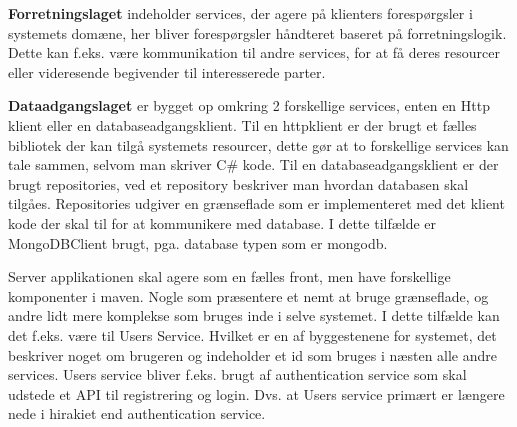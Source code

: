 \textbf{Forretningslaget} indeholder services, der agere på klienters forespørgsler i systemets domæne, her bliver forespørgsler håndteret baseret på forretningslogik. Dette kan f.eks. være kommunikation til andre services, for at få deres resourcer eller videresende begivender til interesserede parter. 

\textbf{Dataadgangslaget} er bygget op omkring 2 forskellige services, enten en Http klient eller en databaseadgangsklient. Til en httpklient er der brugt et fælles bibliotek der kan tilgå systemets resourcer, dette gør at to forskellige services kan tale sammen, selvom man skriver C\# kode. Til en databaseadgangsklient er der brugt repositories, ved et repository beskriver man hvordan databasen skal tilgåes. Repositories udgiver en grænseflade som er implementeret med det klient kode der skal til for at kommunikere med database. I dette tilfælde er MongoDBClient brugt, pga. database typen som er mongodb.

Server applikationen skal agere som en fælles front, men have forskellige komponenter i maven. Nogle som præsentere et nemt at bruge grænseflade, og andre lidt mere komplekse som bruges inde i selve systemet. I dette tilfælde kan det f.eks. være til Users Service. Hvilket er en af byggestenene for systemet, det beskriver noget om brugeren og indeholder et id som bruges i næsten alle andre services. Users service bliver f.eks. brugt af authentication service som skal udstede et API til registrering og login. Dvs. at Users service primært er længere nede i hirakiet end authentication service.